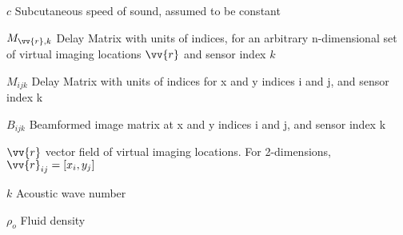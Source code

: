 \begin{eqlist}

\item[$c$] Subcutaneous speed of sound, assumed to be constant

\item[$M_{\vv{r},k}$] Delay Matrix with units of indices, for an arbitrary n-dimensional set of virtual imaging locations $\vv{r}$ and sensor index $k$

\item[$M_{ijk}$] Delay Matrix with units of indices for x and y indices i and j, and sensor index k

\item[$B_{ijk}$] Beamformed image matrix at x and y indices i and j, and sensor index k

\item[$\vv{r}$] vector field of virtual imaging locations. For 2-dimensions, $\vv{r}_{ij} = [x_i, y_j]$

\item[$k$] Acoustic wave number

\item[$\rho_o$] Fluid density

\end{eqlist}

